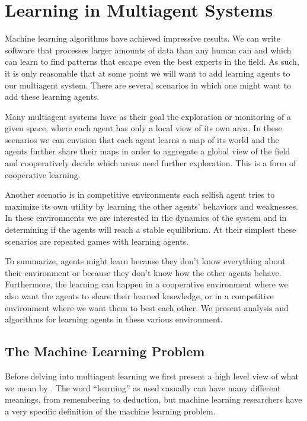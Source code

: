 \chapter{Learning in Multiagent Systems}
\label{cha:learn-mult-syst}



Machine learning algorithms have achieved impressive results. We can
write software that processes larger amounts of data than any human
can and which can learn to find patterns that escape even the best
experts in the field. As such, it is only reasonable that at some
point we will want to add learning agents to our multiagent system.
There are several scenarios in which one might want to add these
learning agents.

Many multiagent systems have as their goal the exploration or
monitoring of a given space, where each agent has only a local view of
its own area. In these scenarios we can envision that each agent
learns a map of its world and the agents further share their maps in
order to aggregate a global view of the field and cooperatively decide
which areas need further exploration. This is a form of cooperative
learning.

Another scenario is in competitive environments each selfish agent
tries to maximize its own utility by learning the other agents'
behaviors and weaknesses. In these environments we are interested in
the dynamics of the system and in determining if the agents will reach
a stable equilibrium. At their simplest these scenarios are repeated
games with learning agents.

To summarize, agents might learn because they don't know everything
about their environment or because they don't know how the other
agents behave. Furthermore, the learning can happen in a cooperative
environment where we also want the agents to share their learned
knowledge, or in a competitive environment where we want them to best
each other. We present analysis and algorithms for learning agents in
these various environment.

\section{The Machine Learning Problem}
\label{sec:machine-learning}

Before delving into multiagent learning we first present a high level
view of what we mean by . The word ``learning''
as used casually can have many different meanings, from remembering to
deduction, but machine learning researchers have a very specific
definition of the machine learning problem.


